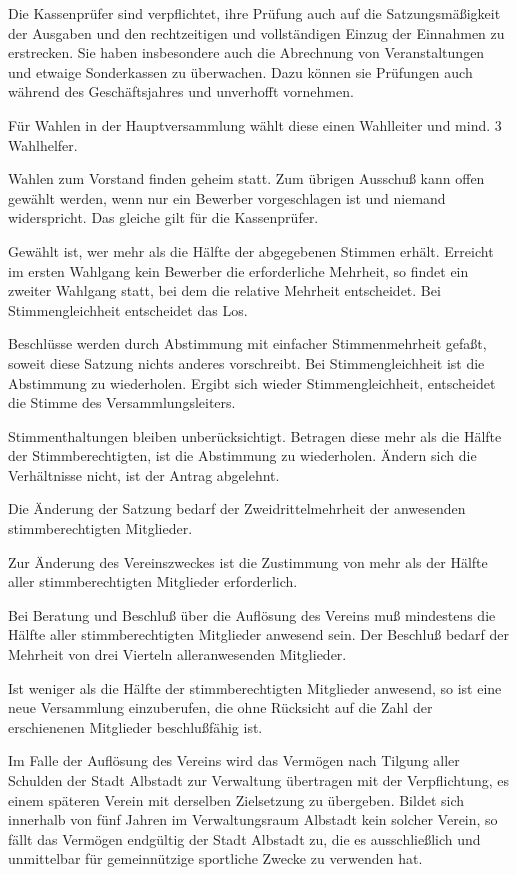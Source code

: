 \documentclass[11pt,a4paper,parskip=half]{scrartcl}
\begin{document}
\begin{contract}
\begin{multicols}{2}
		Die Kassenprüfer sind verpflichtet, ihre Prüfung
		auch auf die Satzungsmäßigkeit der Ausgaben und
		den rechtzeitigen und vollständigen Einzug der
		Einnahmen zu erstrecken. Sie haben insbesondere
		auch die Abrechnung von Veranstaltungen und
		etwaige Sonderkassen zu überwachen. Dazu
		können sie Prüfungen auch während des
		Geschäftsjahres und unverhofft vornehmen.
		
		Für Wahlen in der Hauptversammlung wählt
		diese einen Wahlleiter und mind. 3 Wahlhelfer.
		
		Wahlen zum Vorstand finden geheim statt. Zum
		übrigen Ausschuß kann offen gewählt werden,
		wenn nur ein Bewerber vorgeschlagen ist und
		niemand widerspricht. Das gleiche gilt für die
		Kassenprüfer.
		
		Gewählt ist, wer mehr als die Hälfte der
		abgegebenen Stimmen erhält. Erreicht im ersten
		Wahlgang kein Bewerber die erforderliche
		Mehrheit, so findet ein zweiter Wahlgang statt, bei
		dem die relative Mehrheit entscheidet. Bei
		Stimmengleichheit entscheidet das Los.
		
		Beschlüsse werden durch Abstimmung mit
		einfacher Stimmenmehrheit gefaßt, soweit diese
		Satzung nichts anderes vorschreibt. Bei
		Stimmengleichheit ist die Abstimmung zu
		wiederholen. Ergibt sich wieder
		Stimmengleichheit, entscheidet die Stimme des
		Versammlungsleiters.
		
		Stimmenthaltungen bleiben unberücksichtigt.
		Betragen diese mehr als die Hälfte der
		Stimmberechtigten, ist die Abstimmung zu
		wiederholen. Ändern sich die Verhältnisse nicht, ist
		der Antrag abgelehnt.
		
		Die Änderung der Satzung bedarf der
		Zweidrittelmehrheit der anwesenden
		stimmberechtigten Mitglieder.
		
		Zur Änderung des Vereinszweckes ist die
		Zustimmung von mehr als der Hälfte aller
		stimmberechtigten Mitglieder erforderlich.
		
		Bei Beratung und Beschluß über die Auflösung
		des Vereins muß mindestens die Hälfte aller
		stimmberechtigten Mitglieder anwesend sein. Der
		Beschluß bedarf der Mehrheit von drei Vierteln
		alleranwesenden Mitglieder.
		
		Ist weniger als die Hälfte der stimmberechtigten
		Mitglieder anwesend, so ist eine neue
		Versammlung einzuberufen, die ohne Rücksicht auf
		die Zahl der erschienenen Mitglieder beschlußfähig
		ist.
		
		Im Falle der Auflösung des Vereins wird das
		Vermögen nach Tilgung aller Schulden der Stadt
		Albstadt zur Verwaltung übertragen mit der
		Verpflichtung, es einem späteren Verein mit
		derselben Zielsetzung zu übergeben. Bildet sich
		innerhalb von fünf Jahren im Verwaltungsraum
		Albstadt kein solcher Verein, so fällt das Vermögen
		endgültig der Stadt Albstadt zu, die es
		ausschließlich und unmittelbar für gemeinnützige
		sportliche Zwecke zu verwenden hat.
		\end{multicols}
	\end{contract}	
	
\end{document}
